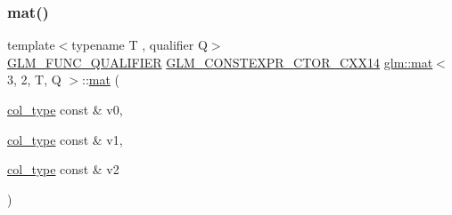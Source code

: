\mbox{\label{structglm_1_1mat_3_013_00_012_00_01_t_00_01_q_01_4_aac5ee27629ac706758b6bed376147ada}} 
\subsubsection{\texorpdfstring{mat()}{mat()}\hspace{0.1cm}{\footnotesize\ttfamily [6/21]}}
{\footnotesize\ttfamily template$<$typename T , qualifier Q$>$ \\
\hyperlink{setup_8hpp_a33fdea6f91c5f834105f7415e2a64407}{G\+L\+M\+\_\+\+F\+U\+N\+C\+\_\+\+Q\+U\+A\+L\+I\+F\+I\+ER} \hyperlink{setup_8hpp_a0900f9145e68bf6061b6f5e7be3fa751}{G\+L\+M\+\_\+\+C\+O\+N\+S\+T\+E\+X\+P\+R\+\_\+\+C\+T\+O\+R\+\_\+\+C\+X\+X14} \hyperlink{structglm_1_1mat}{glm\+::mat}$<$ 3, 2, T, Q $>$\+::\hyperlink{structglm_1_1mat}{mat} (\begin{DoxyParamCaption}\item[{\hyperlink{structglm_1_1mat_3_013_00_012_00_01_t_00_01_q_01_4_aa610dcaaae528e1eea8bdaaa435ad3a4}{col\+\_\+type} const \&}]{v0,  }\item[{\hyperlink{structglm_1_1mat_3_013_00_012_00_01_t_00_01_q_01_4_aa610dcaaae528e1eea8bdaaa435ad3a4}{col\+\_\+type} const \&}]{v1,  }\item[{\hyperlink{structglm_1_1mat_3_013_00_012_00_01_t_00_01_q_01_4_aa610dcaaae528e1eea8bdaaa435ad3a4}{col\+\_\+type} const \&}]{v2 }\end{DoxyParamCaption})}

\mbox{\label{structglm_1_1mat_3_013_00_012_00_01_t_00_01_q_01_4_ad916b01b7ace64b7e07d347b804a1e5a}} 
